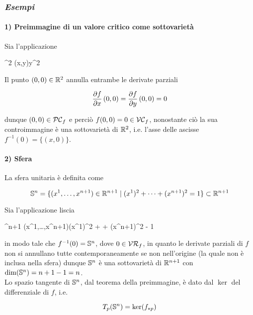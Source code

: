 \subsubsection{\textit{Esempi}}

\paragraph{1) Preimmagine di un valore critico come sottovarietà}

Sia l'applicazione

	{\R^{2}}{\R}
	{(x,y)}{y^{2}}

Il punto $ (0,0) \in \R^{2} $ annulla entrambe le derivate parziali

\begin{equation}
	\pdv{f}{x} \, (0,0) = \pdv{f}{y} \, (0,0) = 0
\end{equation}

dunque $ (0,0) \in \PC_{f} $ e perciò $ f(0,0) = 0 \in \VC_{f} $, nonostante ciò la sua controimmagine è una sottovarietà di $ \R^{2} $, i.e. l'asse delle ascisse $ f^{-1}(0) = \{(x,0)\} $.

\paragraph{2) Sfera}

La sfera unitaria è definita come

\begin{equation}
	\S^{n} = \{ (x^{1},\dots,x^{n+1}) \in \R^{n+1} \mid (x^{1})^{2} + \cdots + (x^{n+1})^{2} = 1 \} \subset \R^{n+1}
\end{equation}

Sia l'applicazione liscia

	{\R^{n+1}}{\R}
	{(x^{1},\dots,x^{n+1})}{(x^{1})^{2} + \cdots + (x^{n+1})^{2} - 1}

in modo tale che $ f^{-1}(0) = \S^{n} $, dove $ 0 \in \VR_{f} $, in quanto le derivate parziali di $ f $ non si annullano tutte contemporaneamente se non nell'origine (la quale non è inclusa nella sfera) dunque $ \S^{n} $ è una sottovarietà di $ \R^{n+1} $ con $ \dim(\S^{n}) = n+1-1 = n $. \\
Lo spazio tangente di $ \S^{n} $, dal teorema della preimmagine, è dato dal $ \ker $ del differenziale di $ f $, i.e. 

\begin{equation}
	T_{p}(\S^{n}) = \ker(f_{*p})
\end{equation}

